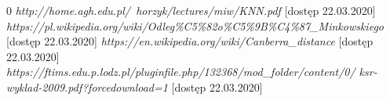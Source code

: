 \documentclass{classrep}
\begin{document}
\begin{thebibliography} {0}
 \textsl{http://home.agh.edu.pl/~horzyk/lectures/miw/KNN.pdf} [dostęp 22.03.2020]
 \textsl{https://pl.wikipedia.org/wiki/Odleg\%C5\%82o\%C5\%9B\%C4\%87\_Minkowskiego} [dostęp 22.03.2020]
 \textsl{https://en.wikipedia.org/wiki/Canberra\_distance} [dostęp 22.03.2020]
 \textsl{https://ftims.edu.p.lodz.pl/pluginfile.php/132368/mod\_folder/content/0/
ksr-wyklad-2009.pdf?forcedownload=1} [dostęp 22.03.2020]
\end{thebibliography}
\end{document}
